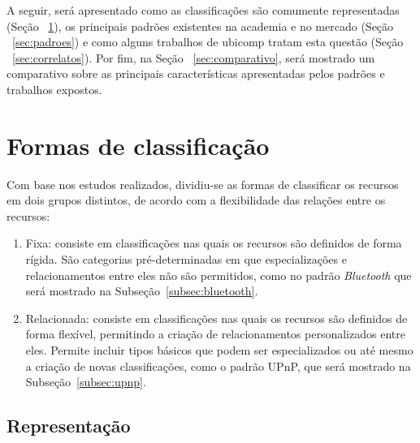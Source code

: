 A seguir, será apresentado como as classificações são comumente representadas (Seção ~\ref{sec:formasDeClass}), os principais padrões existentes na academia e no mercado (Seção ~\ref{sec:padroes}) e como alguns trabalhos de ubicomp tratam esta questão (Seção ~\ref{sec:correlatos}). Por fim, na Seção ~\ref{sec:comparativo}, será mostrado um comparativo sobre as principais características apresentadas pelos padrões e trabalhos expostos.

\section{Formas de classificação}
\label{sec:formasDeClass}

Com base nos estudos realizados, dividiu-se as formas de classificar os recursos em dois grupos distintos, de acordo com a flexibilidade das relações entre os recursos:

\begin{enumerate}
	\item Fixa: consiste em classificações nas quais os recursos são definidos de forma rígida. São categorias pré-determinadas em que especializações e relacionamentos entre eles não são permitidos, como no padrão \emph{Bluetooth} que será mostrado na Subseção~\ref{subsec:bluetooth}.

	\item Relacionada: consiste em classificações nas quais os recursos são definidos de forma flexível, permitindo a criação de relacionamentos personalizados entre eles. Permite incluir tipos básicos que podem ser especializados ou até mesmo a criação de novas classificações, como o padrão UPnP, que será mostrado na Subseção~\ref{subsec:upnp}.
\end{enumerate}

\subsection{Representação}

